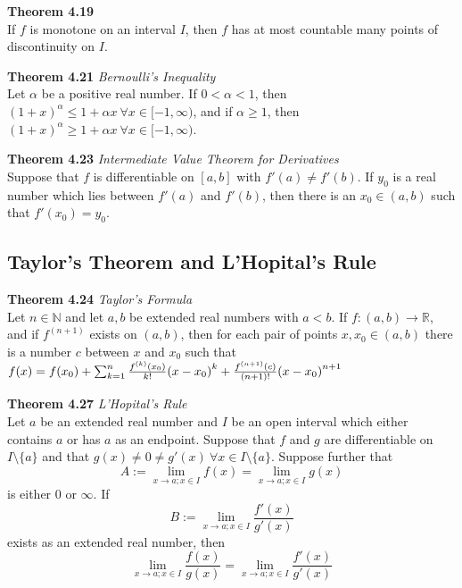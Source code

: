 \documentclass[8pt,landscape]{article}
\begin{document}
\begin{multicols}{3}
    \textbf{Theorem 4.19} \\
    If $f$ is monotone on an interval $I$, then $f$ has at most countable many points
    of discontinuity on $I$.

    \textbf{Theorem 4.21} \emph{Bernoulli's Inequality} \\
    Let $\alpha$ be a positive real number.
    If $0 < \alpha < 1$, then
    ${(1+x)}^\alpha \leq 1 + \alpha x \ \forall x \in [-1, \infty)$,
    and if $\alpha \geq 1$, then
    ${(1+x)}^\alpha \geq 1 + \alpha x \ \forall x \in [-1, \infty)$.

    \textbf{Theorem 4.23} \emph{Intermediate Value Theorem for Derivatives} \\
    Suppose that $f$ is differentiable on $[a, b]$ with $f'(a) \neq f'(b)$.
    If $y_0$ is a real number which lies between $f'(a)$ and $f'(b)$,
    then there is an $x_0 \in (a, b)$ such that $f'(x_0) = y_0$.

    \subsection{Taylor's Theorem and L'Hopital's Rule}

    \textbf{Theorem 4.24} \emph{Taylor's Formula} \\
    Let $n \in \mathbb{N}$ and let $a, b$ be extended real numbers with $a<b$.
    If $f : (a, b) \to \mathbb{R}$, and if $f^{(n+1)}$ exists on $(a, b)$,
    then for each pair of points $x, x_0 \in (a, b)$ there is a number $c$
    between $x$ and $x_0$ such that \\
    $f(x) = f(x_0) + \sum_{k=1}^n \frac{f^{(k)} (x_0)}{k!}{(x-x_0)}^k + \\
    \frac{f^{(n+1)}(c)}{(n+1)!} {(x-x_0)}^{n+1}$

    \textbf{Theorem 4.27} \emph{L'Hopital's Rule} \\
    Let $a$ be an extended real number and $I$ be an open interval which either contains
    $a$ or has $a$ as an endpoint.
    Suppose that $f$ and $g$ are differentiable on $I \setminus \{a\}$ and that
    $g(x) \neq 0 \neq g'(x) \ \forall x \in I \setminus \{a\}$.
    Suppose further that
    \[
        A := \lim_{x \to a; x \in I} f(x) = \lim_{x \to a; x \in I} g(x)
    \]
    is either $0$ or $\infty$.
    If
    \[
        B := \lim_{x \to a; x \in I} \frac{f'(x)}{g'(x)}
    \]
    exists as an extended real number, then
    \[
        \lim_{x \to a; x \in I} \frac{f(x)}{g(x)} =
        \lim_{x \to a; x \in I} \frac{f'(x)}{g'(x)}
    \]


\end{multicols}
\end{document}
